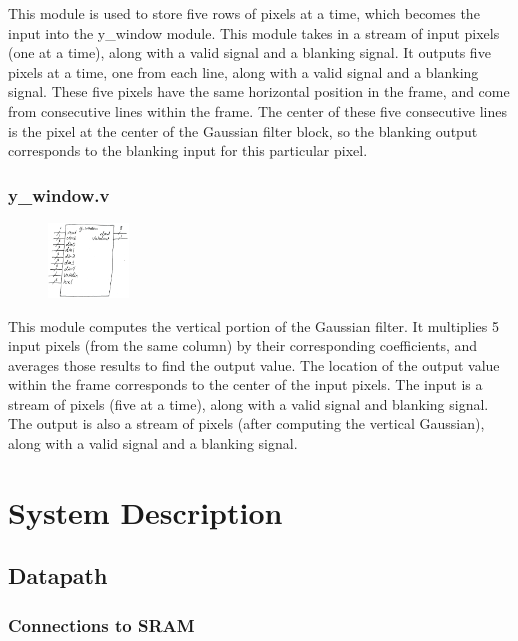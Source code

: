 \documentclass[12pt]{article}
\begin{document}
This module is used to store five rows of pixels at a time, which becomes the 
input into the y\_window module. This module takes in a stream of input pixels 
(one at a time), along with a valid signal and a blanking signal. It outputs 
five pixels at a time, one from each line, along with a valid signal and a 
blanking signal. These five pixels have the same horizontal position in the 
frame, and come from consecutive lines within the frame. The center of these 
five consecutive lines is the pixel at the center of the Gaussian filter block, 
so the blanking output corresponds to the blanking input for this particular 
pixel.

\subsubsection{y\_window.v}

\begin{figure}
    \includegraphics[width=0.19\textwidth]{processed_image_pngs/black_box_modules/y_window_blackbox.png}
\end{figure}

This module computes the vertical portion of the Gaussian filter. It multiplies 
5 input pixels (from the same column) by their corresponding coefficients, and 
averages those results to find the output value. The location of the output 
value within the frame corresponds to the center of the input pixels. The input 
is a stream of pixels (five at a time), along with a valid signal and blanking 
signal. The output is also a stream of pixels (after computing the vertical 
Gaussian), along with a valid signal and a blanking signal.

\section{System Description}

\subsection{Datapath}

\subsubsection{Connections to SRAM}
\end{document}
